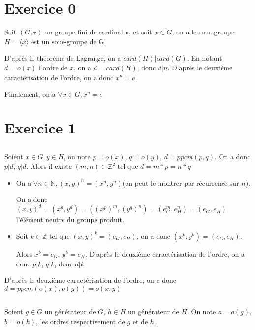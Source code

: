 \documentclass[a4paper,12pt]{book}
\begin{document}
\renewcommand{\labelitemi}{$\blacktriangleright$}
\renewcommand{\labelitemii}{$\bullet$}


\section{Exercice 0}
Soit $(G, ∗)$ un groupe fini de cardinal n, et soit $x \in G$, 
on a le sous-groupe $H=\langle x \rangle$ est un sous-groupe de G.

D'après le théorème de Lagrange, on a $card(H)|card(G)$. En notant $d=o(x)$ l'ordre de $x$, 
on a $d=card(H)$, donc $d|n$. D'après le deuxième caractérisation de l'ordre, on a donc $x^n=e$. 

Finalement, on a $\boxed{\forall x \in G, x^n=e}$
\section{Exercice 1}
\subsection{}
Soient $x \in G, y\in H$, on note $p=o(x)$, $q=o(y)$, $d=ppcm(p,q)$. On a donc $p|d$, $q|d$. Alors il existe 
$(m,n) \in \mathbb{Z}^2$ tel que $d=m*p=n*q$ 
\begin{itemize}
    \item On a $\forall n \in \mathbb{N}, (x,y)^n=(x^n,y^n)$(on peut le montrer par récurrence sur $n$). 
    
    On a donc $(x,y)^d=(x^d,y^d)=((x^p)^m,(y^q)^n)=(e_G^m,e_H^n)=(e_G,e_H)$ l'élément neutre du groupe produit.
    \item Soit $k \in \mathbb{Z}$ tel que $(x,y)^k=(e_G,e_H)$, on a donc $(x^k,y^k)=(e_G,e_H)$. 
    
    Alors $x^k=e_G$, $y^k=e_H$. D'après le deuxième caractérisation de l'ordre, on a donc $p|k$, $q|k$, donc 
    $d|k$
\end{itemize}
D'après le deuxième caractérisation de l'ordre, on a donc $\boxed{d=ppcm(o(x),o(y))=o(x,y)}$
\subsection{}
Soient $g \in G$ un générateur de $G$, $h \in H$ un générateur de $H$. On note $a=o(g)$, $b=o(h)$, les ordres respectivement de $g$ et de $h$.
\end{document}
